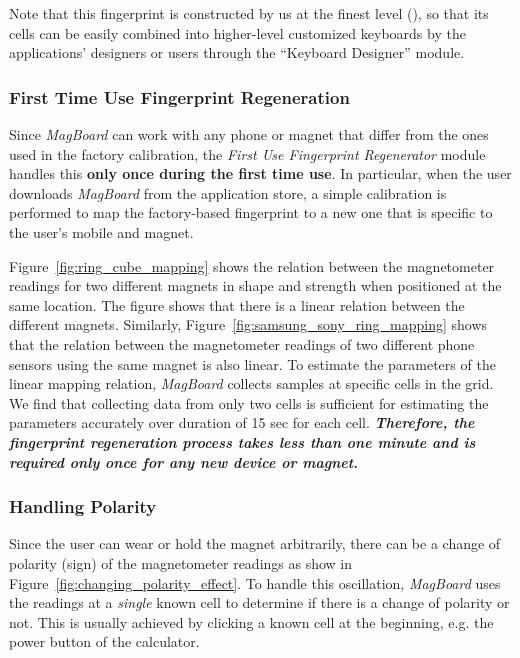 \documentclass[conference]{IEEEtran}
\def \sys {\textit{MagBoard}}
\begin{document}
Note that this fingerprint is constructed by us at the finest level (), so that its cells can be easily combined into higher-level customized keyboards by the applications' designers or users through the ``Keyboard Designer'' module.

\subsubsection{First Time Use Fingerprint Regeneration}

Since \sys{} can work with any phone or magnet that differ from the ones used in the factory calibration, the \textit{First Use Fingerprint Regenerator} module handles this \textbf{only once during the first time use}. In particular, when the user downloads \sys{} from the application store, a simple calibration is performed to map the factory-based fingerprint to a new one that is specific to the user's mobile and magnet.

Figure~\ref{fig:ring_cube_mapping} shows the relation between the magnetometer readings for two different magnets in shape and strength when positioned at the same location. The figure shows that there is a linear relation between the different magnets. 
Similarly, Figure~\ref{fig:samsung_sony_ring_mapping} shows that the relation between the magnetometer readings of two different phone sensors using the same magnet is also linear. 
To estimate the parameters of the linear mapping relation, \sys{} collects samples at specific cells in the grid. We find that collecting data from only two cells is sufficient for estimating the parameters accurately over duration of 15 sec for each cell.
\textbf{\emph{Therefore, the fingerprint regeneration process takes less than one minute and is required only once for any new device or magnet.}}

\subsubsection{Handling Polarity}

Since the user can wear or hold the magnet arbitrarily, there can be a change of polarity (sign) of the magnetometer readings as show in Figure~\ref{fig:changing_polarity_effect}. To handle this oscillation, \sys{} uses the readings at a \emph{single} known cell to determine if there is a change of polarity or not. This is usually achieved by clicking a known cell at the beginning, e.g. the power button of the calculator. 
\end{document}
